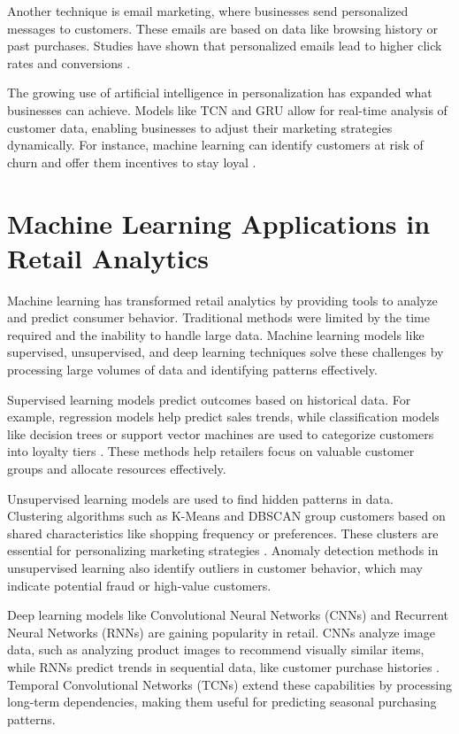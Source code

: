 \documentclass[12pt, a4paper,twoside]{report}
\theoremstyle{plain} %
\theoremstyle{definition} %
\theoremstyle{remark} %
\numberwithin{equation}{chapter}
\begin{document}
Another technique is email marketing, where businesses send personalized messages to customers. These emails are based on data like browsing history or past purchases. Studies have shown that personalized emails lead to higher click rates and conversions \cite{chen2016xgboost}.

The growing use of artificial intelligence in personalization has expanded what businesses can achieve. Models like TCN and GRU allow for real-time analysis of customer data, enabling businesses to adjust their marketing strategies dynamically. For instance, machine learning can identify customers at risk of churn and offer them incentives to stay loyal \cite{scikit-learn2011}.





\section{Machine Learning Applications in Retail Analytics}

Machine learning has transformed retail analytics by providing tools to analyze and predict consumer behavior. Traditional methods were limited by the time required and the inability to handle large data. Machine learning models like supervised, unsupervised, and deep learning techniques solve these challenges by processing large volumes of data and identifying patterns effectively.

Supervised learning models predict outcomes based on historical data. For example, regression models help predict sales trends, while classification models like decision trees or support vector machines are used to categorize customers into loyalty tiers \cite{davenport2020machine}. These methods help retailers focus on valuable customer groups and allocate resources effectively.

Unsupervised learning models are used to find hidden patterns in data. Clustering algorithms such as K-Means and DBSCAN group customers based on shared characteristics like shopping frequency or preferences. These clusters are essential for personalizing marketing strategies \cite{johansson2019unsupervised}. Anomaly detection methods in unsupervised learning also identify outliers in customer behavior, which may indicate potential fraud or high-value customers.

Deep learning models like Convolutional Neural Networks (CNNs) and Recurrent Neural Networks (RNNs) are gaining popularity in retail. CNNs analyze image data, such as analyzing product images to recommend visually similar items, while RNNs predict trends in sequential data, like customer purchase histories \cite{zhang2021deep}. Temporal Convolutional Networks (TCNs) extend these capabilities by processing long-term dependencies, making them useful for predicting seasonal purchasing patterns.
\end{document}
